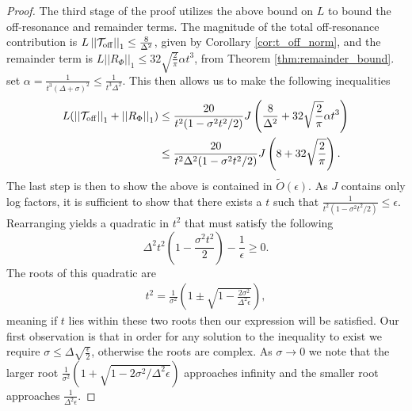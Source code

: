 \documentclass[
 amsmath,amssymb,
 aps,
onecolumn, 
nofootinbib]{revtex4-2}
\newcommand{\off}{\rm off}
\newcommand{\norm}[1]{\left|\left| #1 \right|\right|}
\newcommand{\bigotilde}[1]{\widetilde{O} \left( #1 \right)}
\begin{document}
\begin{proof}
 The third stage of the proof utilizes the above bound on $L$ to bound the  off-resonance and remainder terms. The magnitude of the total off-resonance contribution is $L \norm{\mathcal{T}_{\off}}_1 \le \frac{8 }{\Delta^2}$, given by Corollary \ref{cor:t_off_norm}, and the remainder term is $L \norm{R_{\Phi}}_1 \le 32 \sqrt{\frac{2}{\pi}} \alpha t^3$, from Theorem \ref{thm:remainder_bound}. 
 set $\alpha = \frac{1}{t^3(\Delta + \sigma)^2} \le \frac{1}{t^3 \Delta^2}$. This then allows us to make the following inequalities
 \begin{align}
     L(\norm{\mathcal{T}_{\off}}_1 + \norm{R_{\Phi}}_1) &\le \frac{20}{t^2(1 - \sigma^2 t^2 / 2)}J \left( \frac{8}{\Delta^2} + 32 \sqrt{\frac{2}{\pi}} \alpha t^3 \right) \\
    &\le \frac{20}{t^2 \Delta^2 (1 - \sigma^2 t^2 / 2)}J \left( 8 + 32 \sqrt{\frac{2}{\pi}}\right). \label{eq:single_qubit_tmp_2}
 \end{align}
The last step is then to show the above is contained in $\bigotilde{\epsilon}$. As $J$ contains only log factors, it is sufficient to show that there exists a $t$ such that $\frac{1}{t^2(1 - \sigma^2 t^2 / 2)} \le \epsilon$. Rearranging yields a quadratic in $t^2$ that must satisfy the following
\begin{equation}
    \Delta^2 t^2 \left(1 - \frac{\sigma^2 t^2}{2}\right) - \frac{1}{\epsilon} \ge 0. \label{eq:single_qubit_tmp_3}
\end{equation}
The roots of this quadratic are
\begin{align}
    t^2 = \frac{1}{\sigma^2}\left(1 \pm \sqrt{1 - \frac{2 \sigma^2}{\Delta^2 \epsilon}} \right),
\end{align}
meaning if $t$ lies within these two roots then our expression will be satisfied. Our first observation is that in order for any solution to the inequality to exist we require $\sigma \le \Delta \sqrt{\frac{\epsilon}{2}}$, otherwise the roots are complex. As $\sigma \to 0$ we note that the larger root $\frac{1}{\sigma^2}(1 + \sqrt{1 - 2 \sigma^2 / \Delta^2 \epsilon})$ approaches infinity and the smaller root approaches $\frac{1}{\Delta^2 \epsilon}$.


\end{proof}
\end{document}
